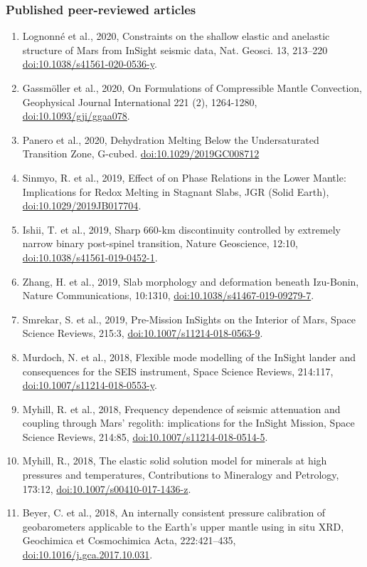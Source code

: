 \documentclass[11pt,twoside,a4paper]{article}
\newcommand{\doi}[1]{\href{http://dx.doi.org/#1}{doi:#1}}
\begin{document}
\subsubsection*{Published peer-reviewed articles}
\begin{enumerate}
\item Lognonn\'e et al., 2020, Constraints on the shallow elastic and anelastic structure of Mars from InSight seismic data, Nat. Geosci. 13, 213--220 \doi{10.1038/s41561-020-0536-y}.
\item Gassm{\"o}ller et al., 2020, On Formulations of Compressible Mantle Convection, Geophysical Journal International 221 (2), 1264-1280, \doi{10.1093/gji/ggaa078}.
\item Panero et al., 2020, Dehydration Melting Below the Undersaturated Transition Zone, G-cubed. \doi{10.1029/2019GC008712}
\item Sinmyo, R. et al., 2019, Effect of  on Phase Relations in the Lower Mantle: Implications for Redox Melting in Stagnant Slabs, JGR (Solid Earth), \doi{10.1029/2019JB017704}.
\item Ishii, T. et al., 2019, Sharp 660-km discontinuity controlled by extremely narrow binary post-spinel transition, Nature Geoscience, 12:10, \doi{10.1038/s41561-019-0452-1}.
\item Zhang, H. et al., 2019, Slab morphology and deformation beneath Izu-Bonin, Nature Communications, 10:1310, \doi{10.1038/s41467-019-09279-7}.
\item Smrekar, S. et al., 2019, Pre-Mission InSights on the Interior of Mars, Space Science Reviews, 215:3, \doi{10.1007/s11214-018-0563-9}.
\item Murdoch, N. et al., 2018, Flexible mode modelling of the InSight lander and consequences for the SEIS instrument, Space Science Reviews, 214:117, \doi{10.1007/s11214-018-0553-y}.
\item Myhill, R. et al., 2018, Frequency dependence of seismic attenuation and coupling through Mars' regolith: implications for the InSight Mission, Space Science Reviews, 214:85, \doi{10.1007/s11214-018-0514-5}.
\item Myhill, R., 2018, The elastic solid solution model for minerals at high pressures and temperatures, Contributions to Mineralogy and Petrology, 173:12, \doi{10.1007/s00410-017-1436-z}.
\item Beyer, C. et al., 2018, An internally consistent pressure calibration of geobarometers applicable to the Earth's upper mantle using in situ XRD, Geochimica et Cosmochimica Acta, 222:421--435, \doi{10.1016/j.gca.2017.10.031}.

\end{enumerate}
\end{document}
